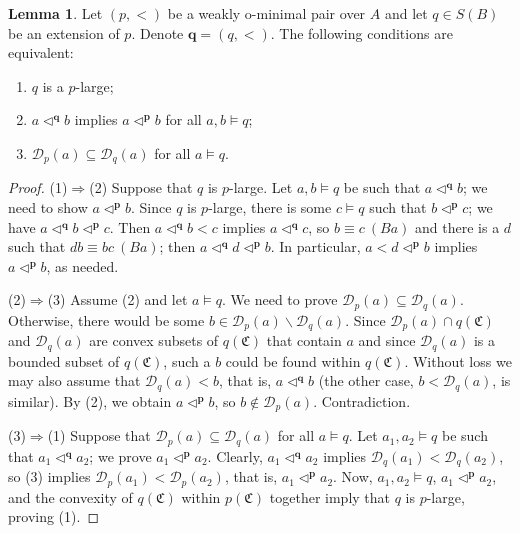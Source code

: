 \documentclass{amsart}
\theoremstyle{definition}
\newtheorem{Lemma}[Theorem]{Lemma}
\theoremstyle{definition}
\newcommand{\Mon}{\mathfrak C}
\begin{document}
\begin{Lemma}\label{lemma large characterization}
Let $(p,<)$ be a weakly o-minimal pair over $A$ and let $q\in S(B)$ be an extension of $p$. Denote $\mathbf q=(q,<)$. 
The following conditions are equivalent:
\begin{enumerate}[\hspace{10pt}(1)]
\item $q$ is a $p$-large;
\item $a\triangleleft^{\mathbf q}b$ implies $a\triangleleft^{\mathbf p}b$ for all $a,b\models q$;
\item $\mathcal{D}_p(a)\subseteq\mathcal{D}_q(a)$ for all $a\models q$.
\end{enumerate}
\end{Lemma}
\begin{proof} 
(1)$\Rightarrow$(2) Suppose that $q$ is $p$-large.
Let $a,b\models q$ be such that $a\triangleleft^{\mathbf q}b$; we need to show $a\triangleleft^{\mathbf p}b$.
Since $q$ is $p$-large, there is some $c\models q$ such that $b\triangleleft^{\mathbf p}c$; we have $a\triangleleft^{\mathbf q}b\triangleleft^{\mathbf p}c$. Then $a\triangleleft^{\mathbf q}b<c$ implies $a\triangleleft^{\mathbf q}c$, so $b\equiv c\ (Ba)$ and there is a $d$ such that $db\equiv bc\ (Ba)$; then $a\triangleleft^{\mathbf q}d\triangleleft^{\mathbf p}b$. In particular, $a<d\triangleleft^{\mathbf p}b$ implies $a\triangleleft^{\mathbf p}b$, as needed.

(2)$\Rightarrow$(3) Assume (2) and let $a\models q$. We need to prove $\mathcal D_p(a)\subseteq\mathcal D_q(a)$. Otherwise, there would be some $b\in\mathcal D_p(a)\smallsetminus\mathcal D_q(a)$. Since $\mathcal D_p(a)\cap q(\Mon)$ and $\mathcal D_q(a)$ are convex subsets of $q(\Mon)$ that contain $a$ and since $\mathcal D_q(a)$ is a bounded subset of $q(\Mon)$, such a $b$ could be found within $q(\Mon)$.  
Without loss we may also assume that $\mathcal D_q(a)<b$, that is, $a\triangleleft^{\mathbf q}b$ (the other case, $b<\mathcal D_q(a)$, is similar). By (2), we obtain $a\triangleleft^{\mathbf p}b$, so $b\notin\mathcal D_p(a)$. Contradiction.

(3)$\Rightarrow$(1) Suppose that $\mathcal{D}_p(a)\subseteq\mathcal{D}_q(a)$ for all $a\models q$. Let $a_1,a_2\models q$ be such that $a_1\triangleleft^{\mathbf q}a_2$; we prove $a_1\triangleleft^{\mathbf{p}}a_2$. Clearly, $a_1\triangleleft^{\mathbf q}a_2$ implies $\mathcal{D}_q(a_1)<\mathcal{D}_q(a_2)$, so (3) implies $\mathcal{D}_p(a_1)< \mathcal{D}_p(a_2)$, that is, $a_1\triangleleft^{\mathbf{p}}a_2$. Now, $a_1,a_2\models q$, $a_1\triangleleft^{\mathbf{p}}a_2$, and the convexity of $q(\Mon)$ within $p(\Mon)$ together imply that $q$ is $p$-large, proving (1). 
\end{proof}
\end{document}
